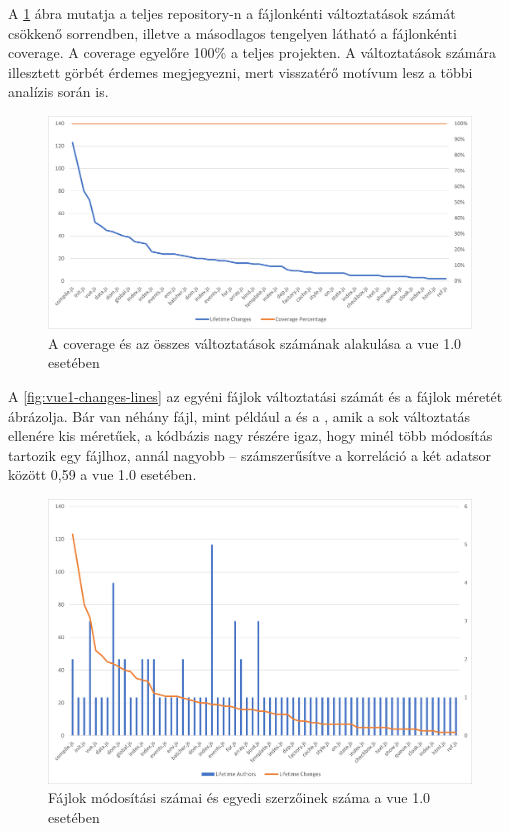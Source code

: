 A \ref{fig:vue1-cov-changes} ábra mutatja a teljes repository-n a fájlonkénti változtatások számát csökkenő sorrendben, illetve a másodlagos tengelyen látható a fájlonkénti coverage. A coverage egyelőre 100\% a teljes projekten. A változtatások számára illesztett görbét érdemes megjegyezni, mert visszatérő motívum lesz a többi analízis során is.

\begin{figure}[H]
    \centering
    \includegraphics[width=1\textwidth]{images/vue/vue1-lifetime-changes.png}
    \caption{A coverage és az összes változtatások számának alakulása a vue 1.0 esetében}
    \label{fig:vue1-cov-changes}
\end{figure}

A \ref{fig:vue1-changes-lines} az egyéni fájlok változtatási számát és a fájlok méretét ábrázolja. Bár van néhány fájl, mint például a  és a , amik a sok változtatás ellenére kis méretűek, a kódbázis nagy részére igaz, hogy minél több módosítás tartozik egy fájlhoz, annál nagyobb -- számszerűsítve a korreláció a két adatsor között 0,59 a vue 1.0 esetében.


\begin{figure}[H]
    \centering
    \includegraphics[width=1\textwidth]{images/vue/vue1-lifetimechanges-authors.png}
    \caption{Fájlok módosítási számai és egyedi szerzőinek száma a vue 1.0 esetében}
    \label{fig:vue1-changes-authors}
\end{figure}

